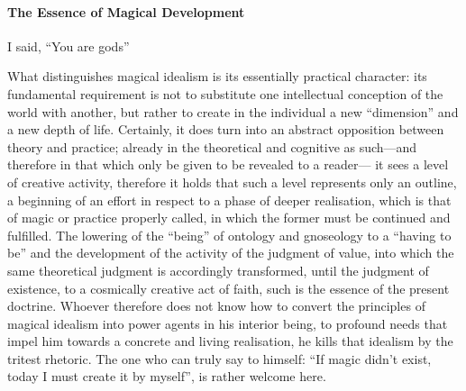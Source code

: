 \paragraph{The Essence of Magical Development}


\begin{quotex}
I said, ``You are gods''

What distinguishes magical idealism is its essentially practical character: its fundamental requirement is not to substitute one intellectual conception of the world with another, but rather to create in the individual a new ``dimension'' and a new depth of life. Certainly, it does turn into an abstract opposition between theory and practice; already in the theoretical and cognitive as such---and therefore in that which only be given to be revealed to a reader--- it sees a level of creative activity, therefore it holds that such a level represents only an outline, a beginning of an effort in respect to a phase of deeper realisation, which is that of magic or practice properly called, in which the former must be continued and fulfilled. The lowering of the ``being'' of ontology and gnoseology to a ``having to be'' and the development of the activity of the judgment of value, into which the same theoretical judgment is accordingly transformed, until the judgment of existence, to a cosmically creative act of faith, such is the essence of the present doctrine. Whoever therefore does not know how to convert the principles of magical idealism into power agents in his interior being, to profound needs that impel him towards a concrete and living realisation, he kills that idealism by the tritest rhetoric. The one who can truly say to himself: ``If magic didn't exist, today I must create it by myself'', is rather welcome here.
\end{quotex}



